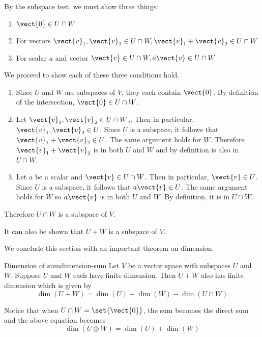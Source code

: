 \begin{solution}
By the subspace test, we must show three things:
\begin{enumerate}
\item $\vect{0} \in U \cap W$
\item For vectors $\vect{v}_1, \vect{v}_2 \in U \cap W, \vect{v}_1+\vect{v}_2 \in U \cap W$
\item For scalar $a$ and vector $\vect{v} \in U \cap W, a\vect{v} \in U \cap W$
\end{enumerate}

We proceed to show each of these three conditions hold.
\begin{enumerate}
\item 
Since $U$ and $W$ are subspaces of $V$, they each contain $\vect{0}$. By definition of the intersection, $\vect{0} \in U \cap W$. 

\item
Let  $\vect{v}_1, \vect{v}_2 \in U \cap W$,. Then in particular,  $\vect{v}_1, \vect{v}_2 \in U$. Since $U$ is a subspace, it follows that $ \vect{v}_1+\vect{v}_2 \in U$. The same argument holds for $W$. Therefore $\vect{v}_1+\vect{v}_2$ is in both $U$ and $W$ and by definition is also in $U \cap W$. 

\item 
Let $a$ be a scalar and $\vect{v} \in U \cap W$. Then in particular, $\vect{v} \in U$. Since $U$ is a subspace, it follows that $a \vect{v} \in U$. The same argument holds for $W$ so $a\vect{v}$ is in both $U$ and $W$. By definition, it is in $U \cap W$. 
\end{enumerate}

Therefore $U \cap W$ is a subspace of $V$. 
\end{solution}

It can also be shown that $U + W$ is a subspace of $V$.

We conclude this section with an important theorem on dimension.

\begin{theorem}{Dimension of sum}{dimension-sum}
Let $V$ be a vector space with subspaces $U$ and $W$. Suppose $U$ and $W$ each have finite dimension. Then $U + W$ also has finite dimension which is given by\[
\dim (U+W) = \dim(U) + \dim(W) - \dim (U \cap W)
\]
\end{theorem}

Notice that when $U \cap W = \set{\vect{0} }$, the sum becomes the direct sum and the above equation becomes 
\[
\dim (U \oplus W) = \dim(U) + \dim(W)
\]
